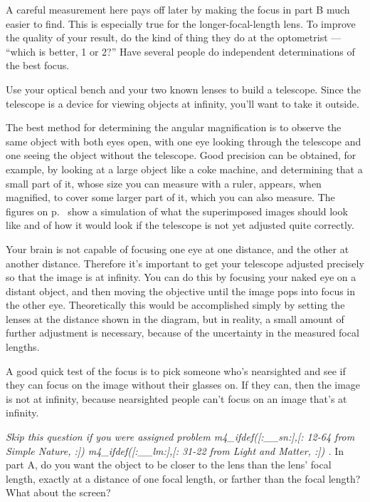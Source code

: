 A careful measurement here pays off later by making the focus in part B much
easier to find. This is especially true for the longer-focal-length lens.
To improve the quality of your result, do the kind of thing they do at the
optometrist --- ``which is better, 1 or 2?'' Have several people do independent
determinations of the best focus.


Use your optical bench and your two known lenses to build a
telescope.
 Since the telescope is a device for viewing objects
at infinity, you'll want to take it outside.

The best method for determining the angular magnification
is to observe the same object with both eyes open, with one
eye looking through the telescope and one seeing the object
without the telescope. Good precision can be obtained, for
example, by looking at a large object like a coke machine,
and determining that a small part of it, whose size you
can measure with a ruler, appears, when magnified, to cover some larger part
of it, which you can also measure. The figures on p.~\pageref{fig:telescope-terrier}
show a simulation of what the superimposed images should look like and of
how it would look if the telescope is not yet adjusted quite correctly.

Your brain is not capable of focusing one eye at one distance, and
the other at another distance. Therefore it's important to get your
telescope adjusted precisely so that the image is at infinity.
You can do this by focusing your naked eye on a distant object, and
then moving the objective until the image pops into focus in the
other eye. Theoretically this would be accomplished simply by setting
the lenses at the distance shown in the diagram, but in reality,
a small amount of further adjustment is necessary, because of the
uncertainty in the measured focal lengths.

A good quick test of the focus is to pick someone who's nearsighted
and see if they can focus on the image without their glasses on.
If they can, then the image is not at infinity, because nearsighted
people can't focus on an image that's at infinity.

\prelab

\prelabquestion    \emph{Skip this question if you were assigned problem
m4_ifdef([:__sn:],[:%
12-64 from Simple Nature,%
:])%
m4_ifdef([:__lm:],[:%
31-22 from Light and Matter,%
:])%
.} 
In part A, do you want the object to be closer to the
lens than the lens' focal length, exactly at a distance of
one focal length, or farther than the focal length?
What about the screen?

